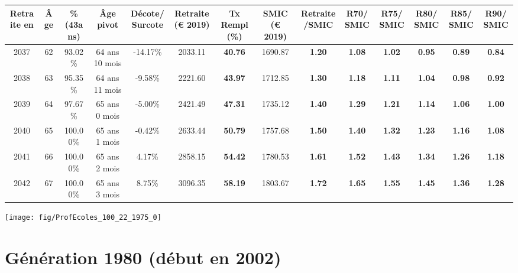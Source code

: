 \begin{adjustbox}{max width=\textwidth} 
\begin{tabular}[htb]{|c|c||c|c|c||c|c||c|c||c|c|c|c|c|} 
\hline 
 Retraite en &  Âge &  \%(43ans) &  Âge pivot &  Décote/Surcote &  Retraite (\euro{} 2019) &  Tx Rempl(\%) &  SMIC (\euro{} 2019) &  Retraite/SMIC &  R70/SMIC &  R75/SMIC &  R80/SMIC &  R85/SMIC &  R90/SMIC \\ 
\hline \hline 
 2037 &  62 &  93.02\% &  64 ans 10 mois &  -14.17\% &  2033.11 &  {\bf 40.76} &  1690.87 &  {\bf 1.20} &  {\bf 1.08} &  {\bf 1.02} &  {\bf {\color{red} 0.95}} &  {\bf {\color{red} 0.89}} &  {\bf {\color{red} 0.84}} \\ 
\hline 
 2038 &  63 &  95.35\% &  64 ans 11 mois &  -9.58\% &  2221.60 &  {\bf 43.97} &  1712.85 &  {\bf 1.30} &  {\bf 1.18} &  {\bf 1.11} &  {\bf 1.04} &  {\bf {\color{red} 0.98}} &  {\bf {\color{red} 0.92}} \\ 
\hline 
 2039 &  64 &  97.67\% &  65 ans 0 mois &  -5.00\% &  2421.49 &  {\bf 47.31} &  1735.12 &  {\bf 1.40} &  {\bf 1.29} &  {\bf 1.21} &  {\bf 1.14} &  {\bf 1.06} &  {\bf {\color{red} 1.00}} \\ 
\hline 
 2040 &  65 &  100.00\% &  65 ans 1 mois &  -0.42\% &  2633.44 &  {\bf 50.79} &  1757.68 &  {\bf 1.50} &  {\bf 1.40} &  {\bf 1.32} &  {\bf 1.23} &  {\bf 1.16} &  {\bf 1.08} \\ 
\hline 
 2041 &  66 &  100.00\% &  65 ans 2 mois &  4.17\% &  2858.15 &  {\bf 54.42} &  1780.53 &  {\bf 1.61} &  {\bf 1.52} &  {\bf 1.43} &  {\bf 1.34} &  {\bf 1.26} &  {\bf 1.18} \\ 
\hline 
 2042 &  67 &  100.00\% &  65 ans 3 mois &  8.75\% &  3096.35 &  {\bf 58.19} &  1803.67 &  {\bf 1.72} &  {\bf 1.65} &  {\bf 1.55} &  {\bf 1.45} &  {\bf 1.36} &  {\bf 1.28} \\ 
\hline 
\hline 
\end{tabular} 
\end{adjustbox} 
 
 \vspace{0.1cm} 

 {\hspace{-2.2cm}\texttt{[image: fig/ProfEcoles\_100\_22\_1975\_0]}} 

\newpage 
 
\section{Génération 1980 (début en 2002)\label{ProfEcoles_100_22_1980_0}} 
 
